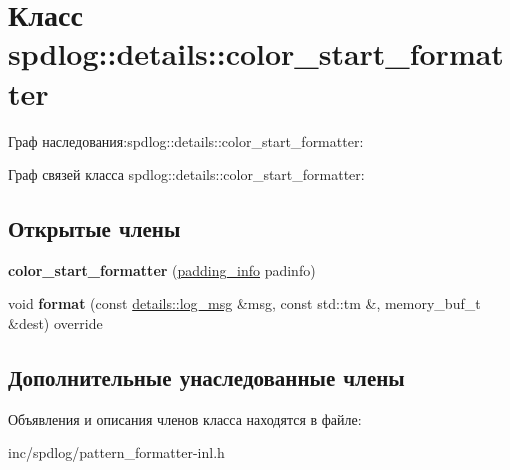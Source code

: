 \hypertarget{classspdlog_1_1details_1_1color__start__formatter}{}\section{Класс spdlog\+:\+:details\+:\+:color\+\_\+start\+\_\+formatter}
\label{classspdlog_1_1details_1_1color__start__formatter}


Граф наследования\+:spdlog\+:\+:details\+:\+:color\+\_\+start\+\_\+formatter\+:


Граф связей класса spdlog\+:\+:details\+:\+:color\+\_\+start\+\_\+formatter\+:
\subsection*{Открытые члены}
\begin{DoxyCompactItemize}
\item 
\mbox{\label{classspdlog_1_1details_1_1color__start__formatter_a5222b004ac21f1b4db466400a324ad21}} 
{\bfseries color\+\_\+start\+\_\+formatter} (\hyperlink{structspdlog_1_1details_1_1padding__info}{padding\+\_\+info} padinfo)
\item 
\mbox{\label{classspdlog_1_1details_1_1color__start__formatter_a574161b1f5e1ab9e51ca1e5659519c9d}} 
void {\bfseries format} (const \hyperlink{structspdlog_1_1details_1_1log__msg}{details\+::log\+\_\+msg} \&msg, const std\+::tm \&, memory\+\_\+buf\+\_\+t \&dest) override
\end{DoxyCompactItemize}
\subsection*{Дополнительные унаследованные члены}


Объявления и описания членов класса находятся в файле\+:\begin{DoxyCompactItemize}
\item 
inc/spdlog/pattern\+\_\+formatter-\/inl.\+h\end{DoxyCompactItemize}
